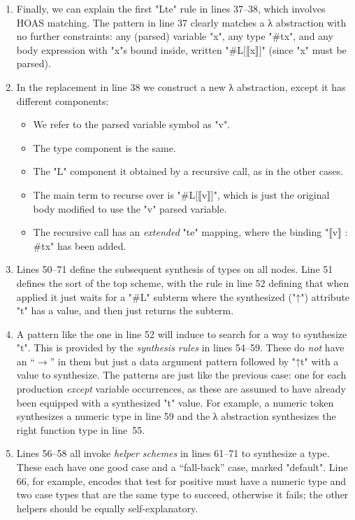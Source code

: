\documentclass[letterpaper]{article}
\begin{document}
\begin{example}[analysis]
\begin{enumerate}
  \item Finally, we can explain the first "Lte" rule in lines 37--38, which involves HOAS
    matching. The pattern in line 37 clearly matches a λ abstraction with no further constraints:
    any (parsed) variable "x", any type "#tx", and any body expression with "x"s bound inside,
    written "#L[⟦x⟧]" (since "x" must be parsed).

  \item In the replacement in line 38 we construct a new λ abstraction, except it has different
    components:
    \begin{itemize}
    \item We refer to the parsed variable symbol as "v".
    \item The type component is the same.
    \item The "L" component it obtained by a recursive call, as in the other cases.
    \item The main term to recurse over is "#L[⟦v⟧]", which is just the original body modified to
      use the "v" parsed variable.
    \item The recursive call has an \emph{extended} "te" mapping, where the binding "⟦v⟧ : #tx" has
      been added.
    \end{itemize}

  \item Lines 50--71 define the subsequent synthesis of types on all nodes. Line 51 defines the sort
    of the top scheme, with the rule in line 52 defining that when applied it just waits for a "#L"
    subterm where the synthesized ("↑") attribute "t" has a value, and then just returns the
    subterm.

  \item A pattern like the one in line 52 will induce \HAX to search for a way to synthesize
    "t". This is provided by the \emph{synthesis rules} in lines 54--59. These do \emph{not} have an
    ``$→$'' in them but just a data argument pattern followed by "↑t" with a value to
    synthesize. The patterns are just like the previous case: one for each production \emph{except}
    variable occurrences, as these are assumed to have already been equipped with a synthesized "t"
    value.  For example, a numeric token synthesizes a numeric type in line 59 and the λ abstraction
    synthesizes the right function type in line~55.

  \item Lines 56--58 all invoke \emph{helper schemes} in lines 61--71 to synthesize a type. These
    each have one good case and a ``fall-back'' case, marked "default". Line 66, for example,
    encodes that test for positive must have a numeric type and two case types that are the same
    type to succeed, otherwise it fails; the other helpers should be equally self-explanatory.

  \end{enumerate}
\end{example}
\end{document}
